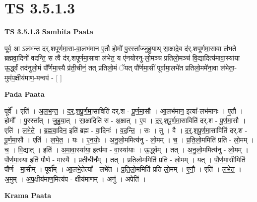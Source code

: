\documentclass[17pt]{extarticle}
\begin{document}
\section{ TS 3.5.1.3 }

\textbf{TS 3.5.1.3 } \newline
\textbf{Samhita Paata} \newline

पूर्व॒ आ ऽल॑भन्त दर्.शपूर्णमा॒सा-वा॒लभ॑मान ए॒तौ होमौ॑ पु॒रस्ता᳚ज्जुहुयाथ् सा॒क्षादे॒व द॑र्.शपूर्णमा॒सावा ल॑भते ब्रह्मवा॒दिनो॑ वदन्ति॒ स त्वै द॑र्.शपूर्णमा॒सावा ल॑भेत॒ य ए॑नयोरनु-लो॒मञ्च॑ प्रतिलो॒मञ्च॑ वि॒द्यादित्य॑मावा॒स्या॑या ऊ॒र्द्ध्वं तद॑नुलो॒मं पौ᳚र्णमा॒स्यै प्र॑ती॒चीनं॒ तत् प्र॑तिलो॒मं ॅयत् पौ᳚र्णमा॒सीं पूर्वा॑मा॒लभे॑त प्रतिलो॒ममे॑ना॒वा ल॑भेता॒-मुम॑प॒क्षीय॑माण॒-मन्वप॑ - [  ] \newline

\textbf{Pada Paata} \newline

पूर्वे᳚ । एति॑ । अ॒ल॒भ॒न्त॒ । द॒र्॒.श॒पू॒र्ण॒मा॒साविति॑ दर्.श - पू॒र्ण॒मा॒सौ । आ॒लभ॑मान॒ इत्या᳚-लभ॑मानः । ए॒तौ । होमौ᳚ । पु॒रस्ता᳚त् । जु॒हु॒या॒त् । सा॒क्षादिति॑ स - अ॒क्षात् । ए॒व । द॒र्॒.श॒पू॒र्ण॒मा॒साविति॑ दर्.श - पू॒र्ण॒मा॒सौ । एति॑ । ल॒भे॒ते॒ । ब्र॒ह्म॒वा॒दिन॒ इति॑ ब्रह्म - वा॒दिनः॑ । व॒द॒न्ति॒ । सः । तु । वै । द॒र्॒.श॒पू॒र्ण॒मा॒साविति॑ दर्.श - पू॒र्ण॒मा॒सौ । एति॑ । ल॒भे॒त॒ । यः । ए॒न॒योः॒ । अ॒नु॒लो॒ममित्य॑नु - लो॒मम् । च॒ । प्र॒ति॒लो॒ममिति॑ प्रति - लो॒मम् । च॒ । वि॒द्यात् । इति॑ । अ॒मा॒वा॒स्या॑या॒ इत्य॑मा - वा॒स्या॑याः । ऊ॒र्द्ध्वम् । तत् । अ॒नु॒लो॒ममित्य॑नु - लो॒मम् । पौ॒र्ण॒मा॒स्या इति॑ पौर्ण - मा॒स्यै । प्र॒ती॒चीन᳚म् । तत् । प्र॒ति॒लो॒ममिति॑ प्रति - लो॒मम् । यत् । पौ॒र्ण॒मा॒सीमिति॑ पौर्ण - मा॒सीम् । पूर्वा᳚म् । आ॒लभे॒तेत्या᳚ - लभे॑त । प्र॒ति॒लो॒ममिति॑ प्रति-लो॒मम् । ए॒नौ॒ । एति॑ । ल॒भे॒त॒ । अ॒मुम् । अ॒प॒क्षीय॑माण॒मित्य॑प - क्षीय॑माणम् । अनु॑ । अपेति॑ ।  \newline


\textbf{Krama Paata} \newline
\end{document}
